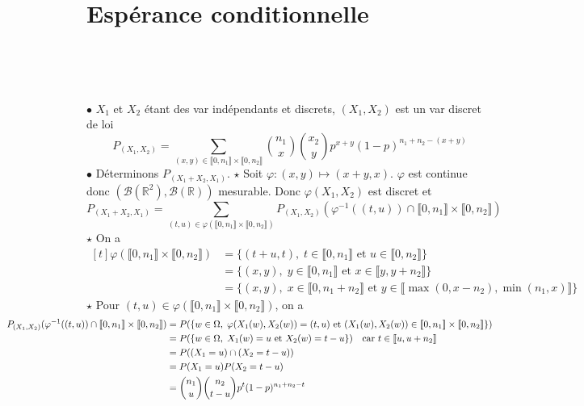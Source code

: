 \documentclass{report}
\begin{document}
\newpage 
\section{Espérance conditionnelle}

\subsection{} \noindent{}\\ 
\\ 
\\
\noindent 
$\bullet$ $X_1$ et $X_2$ étant des var indépendants et discrets, $(X_1,X_2)$ est un var discret de loi $$P_{(X_1,X_2)}=\sum_{(x,y)\in \llbracket 0,n_1\rrbracket\times \llbracket 0,n_2\rrbracket} \binom{n_1}{x} \binom{x_2}{y}p^{x+y} (1-p)^{n_1+n_2-(x+y)}$$
$\bullet$ Déterminons $P_{(X_1+X_2,X_1)}$.\newline
$\star$ Soit $\varphi:(x,y)\mapsto (x+y,x)$. $\varphi$ est continue donc $(\mathcal B(\mathbb R^2), \mathcal B(\mathbb R))$ mesurable. Donc $\varphi(X_1,X_2)$ est discret et $$P_{(X_1+X_2,X_1)} = \sum_{(t,u)\in \varphi(\llbracket 0,n_1\rrbracket\times \llbracket 0,n_2\rrbracket)} P_{(X_1,X_2)}(\varphi^{-1}((t,u))\cap \llbracket 0,n_1\rrbracket\times \llbracket 0,n_2\rrbracket)$$
$\star$ On a $\begin{aligned}[t]\varphi(\llbracket 0,n_1\rrbracket\times \llbracket 0,n_2\rrbracket)&=\{(t+u,t), \; t\in \llbracket 0,n_1\rrbracket \text{ et } u\in \llbracket 0,n_2\rrbracket\} \\
&= \{(x,y), \; y\in \llbracket 0,n_1\rrbracket \text{ et } x\in \llbracket y,y+n_2\rrbracket\} \\
&= \{(x,y), \; x\in \llbracket 0,n_1+n_2\rrbracket \text{ et } y \in \llbracket \max(0,x-n_2),\min(n_1,x)\rrbracket \}
\end{aligned}$\newline
$\star$ Pour $(t,u)\in \varphi(\llbracket 0,n_1\rrbracket\times \llbracket 0,n_2\rrbracket)$, on a $$\hspace*{-3.0cm}\begin{aligned}
P_{(X_1,X_2)}(\varphi^{-1}((t,u))\cap \llbracket 0,n_1\rrbracket\times \llbracket 0,n_2\rrbracket) &=
P(\{w\in \Omega,\; \varphi(X_1(w),X_2(w))=(t,u) \text{ et } (X_1(w),X_2(w))\in \llbracket 0,n_1\rrbracket\times \llbracket 0,n_2\rrbracket \}) \\
&= P(\{w\in \Omega,\; X_1(w)=u \text{ et } X_2(w)=t-u  \}) \quad \text {car } t\in \llbracket u,u+n_2\rrbracket  \\
&= P((X_1=u) \cap (X_2=t-u) )\\
&= P(X_1=u) P(X_2=t-u)\\
&= \binom{n_1}{u}\binom{n_2}{t-u}p^t (1-p)^{n_1+n_2-t}
\end{aligned}$$
\end{document}
